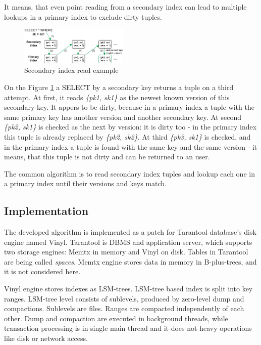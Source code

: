 \documentclass{vldb}
\begin{document}
It means, that even point reading from a secondary index can lead to multiple
lookups in a primary index to exclude dirty tuples.
\begin{figure}
\centering
\includegraphics[width=0.46\textwidth]{secondary_reading_example}
\caption{Secondary index read example}
\label{fig:secondary_reading_example}
\end{figure}
On the Figure \ref{fig:secondary_reading_example} a SELECT by a secondary key
returns a tuple on a third attempt. At first, it reads \textit{\{pk1, sk1\}} as
the newest known version of this secondary key. It appers to be dirty, because
in a primary index a tuple with the same primary key has another version and
another secondary key. At second \textit{\{pk2, sk1\}} is checked as the next
by version: it is dirty too - in the primary index this tuple is already
replaced by \textit{\{pk2, sk2\}}. At third \textit{\{pk3, sk1\}} is checked,
and in the primary index a tuple is found with the same key and the same
version - it means, that this tuple is not dirty and can be returned to an user.

The common algorithm is to read secondary index tuples and lookup each one in a
primary index until their versions and keys match.

\subsection{Implementation}

The developed algorithm is implemented as a patch for Tarantool database's disk
engine named Vinyl. Tarantool is DBMS and application server, which supports two
storage engines: Memtx in memory and Vinyl on disk. Tables in Tarantool are
being called \textit{spaces}. Memtx engine stores data in memory in
B-plus-trees, and it is not considered here.

Vinyl engine stores indexes as LSM-trees. LSM-tree based index is split into key
ranges. LSM-tree level consists of sublevels, produced by zero-level dump and
compactions. Sublevels are files. Ranges are compacted independently of each
other. Dump and compaction are executed in background threads, while transaction
processing is in single main thread and it does not heavy operations like disk
or network access.
\end{document}
